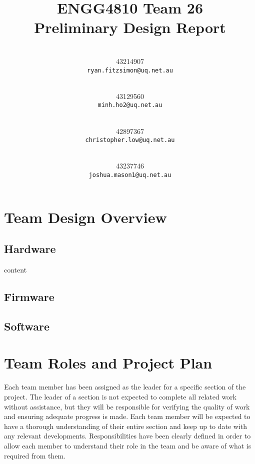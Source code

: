 \documentclass[12pt]{report}
\title{\vspace{-2cm}ENGG4810 Team 26\\
	Preliminary Design Report\vspace{1cm}}
\author{
	\makebox[.4\linewidth]{Ryan Fitzimon}\\
	43214907\\
	\texttt{ryan.fitzsimon@uq.net.au}
	\and
	\makebox[.4\linewidth]{Minh Toan Ho}\\
	43129560\\
	\texttt{minh.ho2@uq.net.au}
	\and
	\makebox[.4\linewidth]{Christopher Low}\\
	42897367\\
	\texttt{christopher.low@uq.net.au}
	\and
	\makebox[.4\linewidth]{Joshua Mason}\\
	43237746\\
	\texttt{joshua.mason1@uq.net.au}
	\vspace{1cm}
}
\begin{document}
\maketitle

\chapter{Team Design Overview}
\section{Hardware}
content
\section{Firmware}
\section{Software}

\chapter{Team Roles and Project Plan}
Each team member has been assigned as the leader for a specific section of the project. The leader of a section is not expected to complete all related work without assistance, but they will be responsible for verifying the quality of work and ensuring adequate progress is made. Each team member will be expected to have a thorough understanding of their entire section and keep up to date with any relevant developments. Responsibilities have been clearly defined in order to allow each member to understand their role in the team and be aware of what is required from them.
\end{document}
